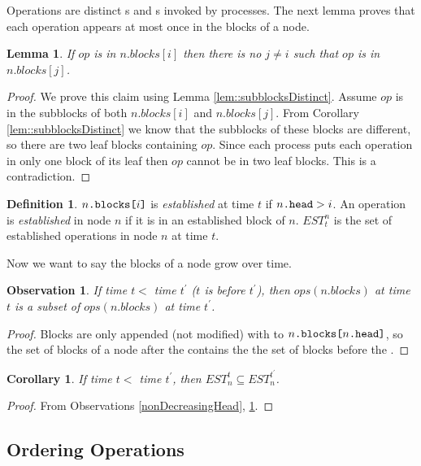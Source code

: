 \documentclass[10pt]{article}
\renewcommand{\it}[1]{\textit{#1}}
\newcommand{\nf}[1]{{\normalfont{\texttt{#1}}}}
\newtheorem{lemma}[theorem]{Lemma}
\newtheorem{corollary}[theorem]{Corollary}
\newtheorem{observation}[theorem]{Observation}
\theoremstyle{definition}
\newtheorem{definition}[theorem]{Definition}
\begin{document}
Operations are distinct \nf{Enqueue}s and \nf{Dequeue}s invoked by processes. The next lemma proves that each operation appears at most once in the blocks of a node.
\begin{lemma}\label{lem::noDuplicates}
If $op$ is in $n.blocks[i]$ then there is no $j\neq i$ such that $op$ is in $n.blocks[j]$.
\end{lemma}
\begin{proof}
We prove this claim using Lemma \ref{lem::subblocksDistinct}. Assume $op$ is in the subblocks of both $n.blocks[i]$ and $n.blocks[j]$. From Corollary \ref{lem::subblocksDistinct} we know that the subblocks of these blocks are different, so there are two leaf blocks containing $op$. Since each process puts each operation in only one block of its leaf then $op$ cannot be in two leaf blocks. This is a contradiction.
\end{proof}

\begin{definition}
$n\nf{.blocks[}i\nf{]}$ is \emph{established} at time $t$ if $n\nf{.head}>i$. An operation is \it{established} in node $n$ if it is in an established block of $n$. $EST^n_t$ is the set of established operations in node $n$ at time $t$.
\end{definition}

Now we want to say the blocks of a node grow over time.
\begin{observation}\label{lem::blocksOrder}
  If  time $t<$ time $t^\prime$ ($t$ is before $t^\prime$), then $ops(n.blocks)$ at time $t$ is a subset of $ops(n.blocks)$ at time $t^\prime$.
\end{observation}
\begin{proof}
Blocks are only appended (not modified) with \nf{CAS} to $n\nf{.blocks[}n\nf{.head]}$, so the set of blocks of a node after the \nf{CAS} contains the the set of blocks before the \nf{CAS}.
\end{proof}

\begin{corollary}\label{lem::establishedOrder}
  If  time $t<$ time $t^\prime$, then $EST_n^t\subseteq EST_n^{t^\prime}$.
\end{corollary}
\begin{proof}
From Observations \ref{nonDecreasingHead}, \ref{lem::blocksOrder}.  
\end{proof}

\pagebreak

\subsection{Ordering Operations}
\end{document}

